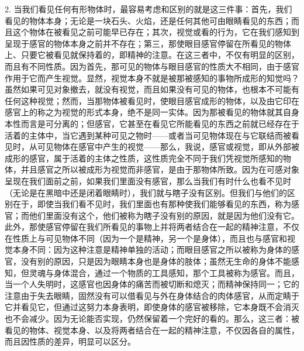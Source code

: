 2. 当我们看见任何有形物体时，最容易考虑和区别的就是这三件事：首先，我们看见的物体本身；无论是一块石头、火焰，还是任何其他可由眼睛看见的东西；而且这个物体在被看见之前可能早已存在；其次，视觉或看的行为，它在我们感知到呈现于感官的物体本身之前并不存在；第三，那使眼目感官停留在所看见的物体上、只要它被看见就保持着的，即精神的注意。在这三者中，不仅有明显的区别，而且有不同性质。因为首先，那可见的物体与眼目感官的性质大不相同，由于感官作用于它而产生视觉。显然，视觉本身不就是被那被感知的事物所成形的知觉吗？虽然如果可见对象撤去，就没有视觉，而且如果没有可见的物体，也根本不可能有任何这种视觉；然而，当那物体被看见时，使眼目感官成形的物体，以及由它印在感官上的称之为视觉的形式本身，绝不是同一实体。因为那被看见的物体就其自身本性而言是可分离的；但感官，它甚至在看见它所能看见的东西之前就已经存在于活着的主体中，当它遇到某种可见之物时——或者当可见物体现在与它联结而被看见时，从可见物体在感官中产生的视觉——那么，我说，感官或视觉，即从外部被成形的感官，属于活着的主体之性质，这性质完全不同于我们凭视觉所感知的物体，并且感官之所以被成形为视觉而非感官，是由于那物体所致。因为在可感对象呈现在我们面前之前，如果我们里面没有感官，那么当我们有时什么也看不见时（无论是在黑暗中还是闭着眼睛时），我们就与瞎子没有区别。但我们与他们的区别在于，即使当我们看不见时，我们里面也有那种使我们能够看见的东西，称为感官；而他们里面没有这个，他们被称为瞎子没有别的原因，就是因为他们没有它。此外，那使感官停留在我们所看见的事物上并将两者结合在一起的精神注意，不仅在性质上与可见物体不同（因为一个是精神，另一个是身体），而且也与感官和视觉本身不同：因为这种注意是精神单独的活动；而眼目感官之所以被称为身体的感官，没有别的原因，只是因为眼睛本身也是身体的肢体；虽然无生命的身体不能感知，但灵魂与身体混合，通过一个物质的工具感知，那个工具被称为感官。而且，当一个人失明时，这感官也因身体的痛苦而被切断和熄灭；而精神保持同一；它的注意由于失去眼睛，固然没有可以借看见与外在身体结合的肉体感官，从而定睛于它并看见它，但通过这努力本身表明，即使身体的感官被移除，它本身既不会消灭也不会减少。因为无论能否实现，仍然保留着一个完好的看的。那么，这三者：被看见的物体、视觉本身、以及将两者结合在一起的精神注意，不仅因各自的属性，而且因性质的差异，明显可以区分。\par

